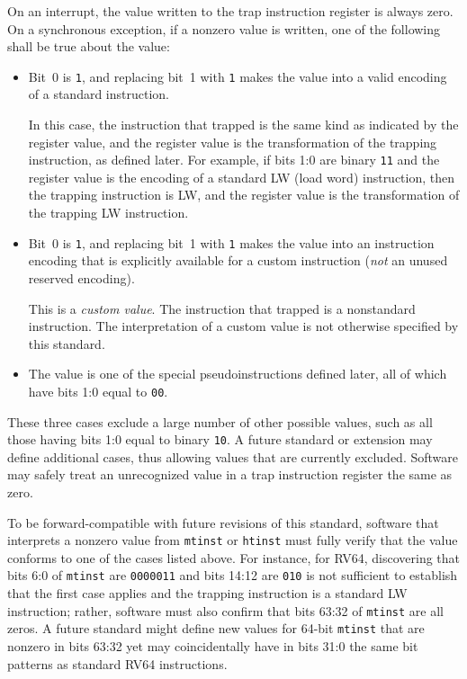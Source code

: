 On an interrupt, the value written to the trap instruction register is
always zero.
On a synchronous exception, if a nonzero value is written, one of the
following shall be true about the value:

\begin{itemize}

\item
Bit~0 is {\tt 1}, and replacing bit~1 with {\tt 1} makes the value into a
valid encoding of a standard instruction.

In this case, the instruction that trapped is the same kind as indicated
by the register value, and the register value is the transformation of
the trapping instruction, as defined later.
For example, if bits 1:0 are binary {\tt 11} and the register value is
the encoding of a standard LW (load word) instruction, then the trapping
instruction is LW, and the register value is the transformation of the
trapping LW instruction.

\item
Bit~0 is {\tt 1}, and replacing bit~1 with {\tt 1} makes the value into
an instruction encoding that is explicitly available for a custom
instruction (\emph{not} an unused reserved encoding).

This is a \textit{custom value}.
The instruction that trapped is a nonstandard instruction.
The interpretation of a custom value is not otherwise specified by this
standard.

\item
The value is one of the special pseudoinstructions defined later, all of
which have bits 1:0 equal to {\tt 00}.

\end{itemize}

These three cases exclude a large number of other possible values, such
as all those having bits 1:0 equal to binary {\tt 10}.
A future standard or extension may define additional cases, thus allowing
values that are currently excluded.
Software may safely treat an unrecognized value in a trap instruction
register the same as zero.

\begin{commentary}
To be forward-compatible with future revisions of this standard, software
that interprets a nonzero value from {\tt mtinst} or {\tt htinst} must
fully verify that the value conforms to one of the cases listed above.
For instance, for RV64, discovering that bits 6:0 of {\tt mtinst} are
{\tt 0000011} and bits 14:12 are {\tt 010} is not sufficient to establish
that the first case applies and the trapping instruction is a standard LW
instruction;
rather, software must also confirm that bits 63:32 of {\tt mtinst} are
all zeros.
A future standard might define new values for 64-bit {\tt mtinst} that
are nonzero in bits 63:32 yet may coincidentally have in bits 31:0 the
same bit patterns as standard RV64 instructions.
\end{commentary}

